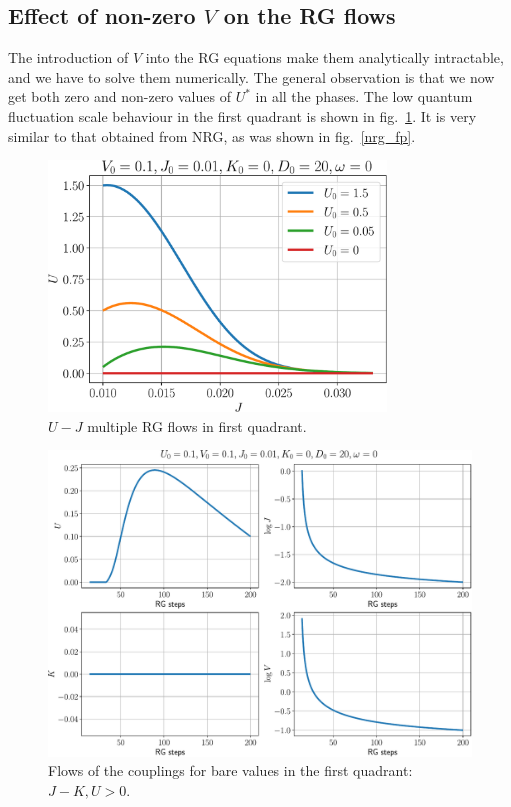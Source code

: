 \documentclass[twoside,11pt]{report}
\numberwithin{equation}{section}
\begin{document}
\subsection{Effect of non-zero \(V\) on the RG flows}
The introduction of \(V\) into the RG equations make them analytically intractable, and we have to solve them numerically. The general observation is that we now get both zero and non-zero values of \(U^*\) in all the phases. The low quantum fluctuation scale behaviour in the first quadrant is shown in fig.~\ref{Veffect}. It is very similar to that obtained from NRG, as was shown in fig.~\ref{nrg_fp}.
\begin{figure}[htpb]
	\centering
	\includegraphics[width=0.8\textwidth]{../figures/UvsJ_new.pdf}
	\caption{\(U-J\) multiple RG flows in first quadrant.}
	\label{Veffect}
\end{figure}

\begin{figure}[htpb!]
	\centering
	\includegraphics[width=\textwidth]{../figures/with_V_new.pdf}
	\caption{Flows of the couplings for bare values in the first quadrant: \(J-K,U>0\).}
\end{figure}
\end{document}
